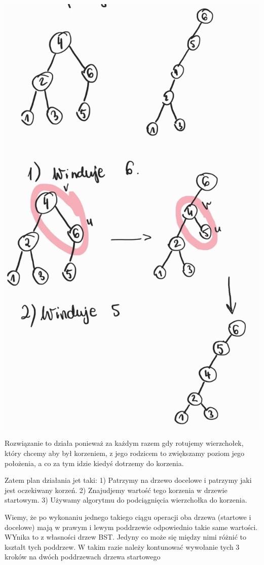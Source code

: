 \documentclass[12pt]{article}
\begin{document}
\includegraphics[scale=0.2]{zad6_2.png}

Rozwiązanie to działa ponieważ za każdym razem gdy rotujemy wierzchołek, który chcemy aby był korzeniem, z jego rodzicem to zwiększamy poziom jego położenia, a co za tym idzie kiedyś dotrzemy do korzenia.

Zatem plan działania jet taki:
1) Patrzymy na drzewo docelowe i patrzymy jaki jest oczekiwany korzeń.
2) Znajudjemy wartość tego korzenia w drzewie startowym.
3) Używamy algorytmu do podciągnięcia wierzchołka do korzenia.

Wiemy, że po wykonaniu jednego takiego ciągu operacji oba drzewa (startowe i docelowe) mają w prawym i lewym poddrzewie odpowiednio takie same wartości. WYnika to z własności drzew BST.
Jedyny co może się między  nimi różnić to kształt tych poddrzew. 
W takim razie należy kontunować wywołanie tych 3 kroków na dwóch poddrzewach drzewa startowego
\end{document}
